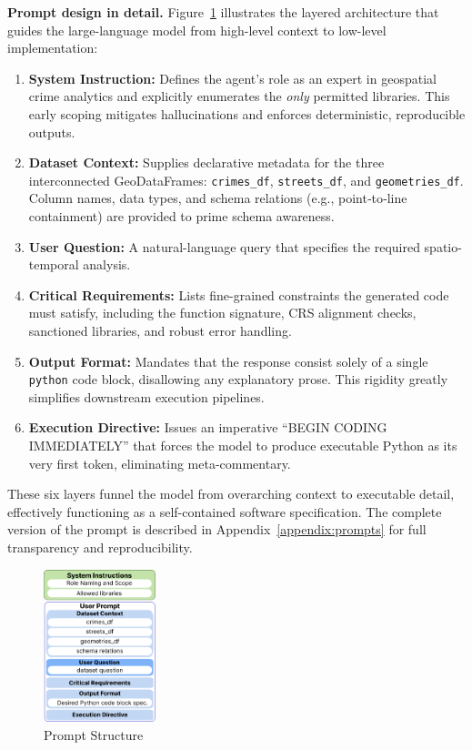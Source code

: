 \medskip
\noindent
\textbf{Prompt design in detail.}  
Figure~\ref{fig:prompt_structure} illustrates the layered architecture that guides the large-language model from high-level context to low-level implementation:

\begin{enumerate}
  \item \textbf{System Instruction:} Defines the agent’s role as an expert in geospatial crime analytics and explicitly enumerates the \emph{only} permitted libraries.  
  This early scoping mitigates hallucinations and enforces deterministic, reproducible outputs.
  
  \item \textbf{Dataset Context:} Supplies declarative metadata for the three interconnected GeoDataFrames: \texttt{crimes\_df}, \texttt{streets\_df}, and \texttt{geometries\_df}.  
  Column names, data types, and schema relations (e.g., point‐to‐line containment) are provided to prime schema awareness.
  
  \item \textbf{User Question:} A natural-language query that specifies the required spatio-temporal analysis.
  
  \item \textbf{Critical Requirements:} Lists fine-grained constraints the generated code must satisfy, including the function signature, CRS alignment checks, sanctioned libraries, and robust error handling.
  
  \item \textbf{Output Format:} Mandates that the response consist solely of a single \texttt{python} code block, disallowing any explanatory prose.  
  This rigidity greatly simplifies downstream execution pipelines.
  
  \item \textbf{Execution Directive:} Issues an imperative \enquote{BEGIN CODING IMMEDIATELY} that forces the model to produce executable Python as its very first token, eliminating meta-commentary.
\end{enumerate}

These six layers funnel the model from overarching context to executable detail, effectively functioning as a self-contained software specification.  
The complete version of the prompt is described in Appendix~\ref{appendix:prompts} for full transparency and reproducibility.

\begin{figure}[hbtp]
  \centering
  \includegraphics[width=0.29\textwidth]{images/prompt.png}
  \caption{Prompt Structure}
  \label{fig:prompt_structure}
\end{figure}


